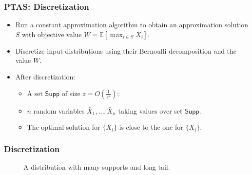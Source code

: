 \documentclass{beamer}
\newcommand{\Exp}{{\mathbb{E}}}
\begin{document}
\begin{frame}
    \frametitle{PTAS: Discretization}
    \begin{itemize}
        \item    Run a constant approximation algorithm to obtain an approximation solution $S$ with objective value $W = \Exp[\max_{i\in S} X_i]$.\\
        \item    Discretize input distributions using their Bernoulli decomposition and the value $W$.\\
        \item    After discretization:
    \begin{itemize}
        \item A set $\mathsf{Supp}$ of size $z = O(\frac{1}{\varepsilon^2})$;
        \item $n$ random variables $\bar X_1, \ldots, \bar X_n$ taking values over set $\mathsf{Supp}$.
        \item The optimal solution for $\{\bar X_i\}$ is close to the one for $\{X_i\}$.
    \end{itemize}
    \end{itemize}

\end{frame}
\begin{frame}
    \frametitle{Discretization}
    \begin{figure}
    \caption{A distribution with many supports and long tail.}
\end{figure}
\end{frame}
\end{document}
